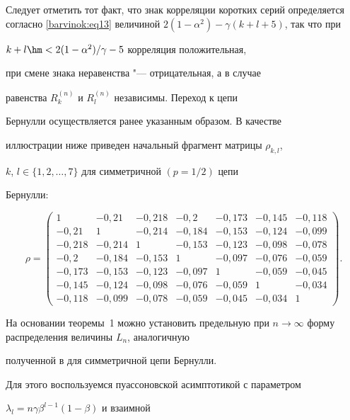 Следует отметить тот факт, что знак корреляции коротких серий определяется согласно \eqref{barvinok:eq13} величиной $2(1-\alpha^2)-\gamma (k+l+5)$, так что при

${k+l}\hm <{{2(1-\alpha ^2)}/{\gamma }-5}$ корреляция положительная,

при смене знака неравенства "--- отрицательная, а в случае

равенства $R_k^{(n)} $ и $R_l^{(n)}$ независимы. Переход к цепи

Бернулли осуществляется ранее указанным образом. В качестве

иллюстрации ниже приведен начальный фрагмент матрицы $\rho_{k,l}$,

$k$, $l\in \{ 1,2,\ldots,7\}$ для симметричной $(p=1/2)$ цепи

Бернулли:

$$

\rho=

\begin{pmatrix}

1& -0,21 & -0,218 & -0,2 &-0,173 & -0,145 & -0,118\\

-0,21  & 1 & -0,214 & -0,184 &-0,153 & -0,124 & -0,099\\

-0,218 & -0,214 & 1 & -0,153 &-0,123 & -0,098 & -0,078\\

-0,2 & -0,184 & -0,153 & 1 &-0,097 & -0,076 & -0,059\\

-0,173 & -0,153 & -0,123 & -0,097 &1 & -0,059 & -0,045\\

-0,145 & -0,124 & -0,098 & -0,076 &-0,059 & 1 & -0,034\\

-0,118 & -0,099 & -0,078 & -0,059 &-0,045 & -0,034 & 1

\end{pmatrix}.

$$



На основании теоремы~1 можно установить предельную при $n\to

\infty $ форму распределения величины $L_n$, аналогичную

полученной в \cite{barvinok:bib7} для симметричной цепи Бернулли.

Для этого воспользуемся пуассоновской асимптотикой с параметром

$\lambda _l =n\gamma \beta ^{l-1}(1-\beta)$ и взаимной

